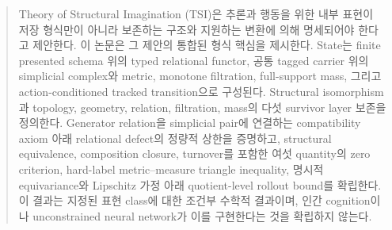 \begin{abstract}
Theory of Structural Imagination (TSI)은 추론과 행동을 위한 내부 표현이 저장
형식만이 아니라 보존하는 구조와 지원하는 변환에 의해 명세되어야 한다고
제안한다. 이 논문은 그 제안의 통합된 형식 핵심을 제시한다. State는 finite
presented schema 위의 typed relational functor, 공통 tagged carrier 위의
simplicial complex와 metric, monotone filtration, full-support mass, 그리고
action-conditioned tracked transition으로 구성된다. Structural isomorphism과
topology, geometry, relation, filtration, mass의 다섯 survivor layer 보존을
정의한다. Generator relation을 simplicial pair에 연결하는 compatibility
axiom 아래 relational defect의 정량적 상한을 증명하고, structural equivalence,
composition closure, turnover를 포함한 여섯 quantity의 zero criterion,
hard-label metric--measure triangle inequality, 명시적 equivariance와 Lipschitz
가정 아래 quotient-level rollout bound를 확립한다. 이 결과는 지정된 표현
class에 대한 조건부 수학적 결과이며, 인간 cognition이나 unconstrained neural
network가 이를 구현한다는 것을 확립하지 않는다.
\end{abstract}
